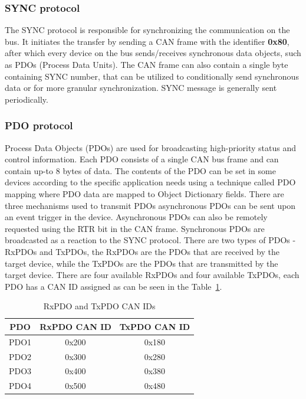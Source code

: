 \subsubsection{SYNC protocol}
The SYNC protocol is responsible for synchronizing the communication on the bus.
It initiates the transfer by sending a CAN frame with the identifier \textbf{0x80}, after which every device on the bus sends/receives synchronous data objects, such as PDOs (Process Data Units).
The CAN frame can also contain a single byte containing SYNC number, that can be utilized to conditionally send synchronous data or for more granular synchronization\cite{can_in_automation_can_2021}.
SYNC message is generally sent periodically.

\subsubsection{PDO protocol}
Process Data Objects (PDOs) are used for broadcasting high-priority status and control information\cite{can_in_automation_can_2021}.
Each PDO consists of a single CAN bus frame and can contain up-to 8 bytes of data.
The contents of the PDO can be set in some devices according to the specific application needs using a technique called PDO mapping where PDO data are mapped to Object Dictionary fields.
There are three mechanisms used to transmit PDOs asynchronous PDOs can be sent upon an event trigger in the device.
Asynchronous PDOs can also be remotely requested using the RTR bit in the CAN frame.
Synchronous PDOs are broadcasted as a reaction to the SYNC protocol.
There are two types of PDOs - RxPDOs and TxPDOs, the RxPDOs are the PDOs that are received by the target device, while the TxPDOs are the PDOs that are transmitted by the target device.
There are four available RxPDOs and four available TxPDOs, each PDO has a CAN ID assigned as can be seen in the Table~\ref{tab:pdo}.

\begin{table}[H]
    \centering
    \begin{tabular}{ |c|c|c| }
        \hline
        PDO & RxPDO CAN ID & TxPDO CAN ID \\
        \hline
        \hline
        PDO1 & 0x200 & 0x180 \\
        \hline
        PDO2 & 0x300 & 0x280 \\
        \hline
        PDO3 & 0x400 & 0x380 \\
        \hline
        PDO4 & 0x500 & 0x480 \\
        \hline
    \end{tabular}
    \caption{RxPDO and TxPDO CAN IDs\cite{noauthor_canopen_2021}}
    \label{tab:pdo}
\end{table}

